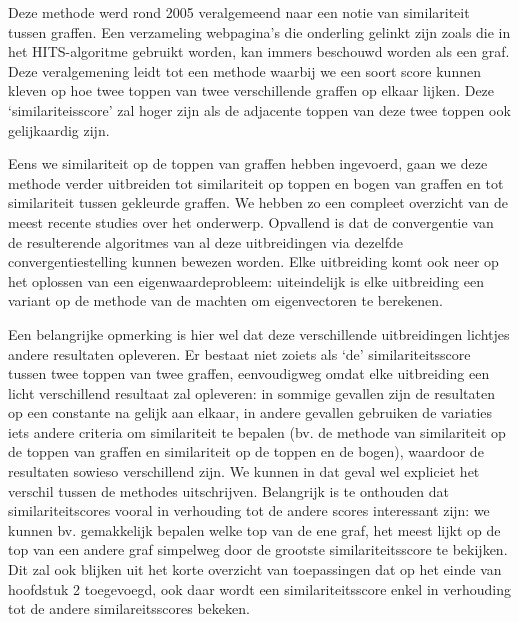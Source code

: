 \documentclass[a4paper,11pt]{report}
\begin{document}
Deze methode werd rond 2005 veralgemeend naar een notie van similariteit tussen 
graffen. Een verzameling webpagina's die onderling gelinkt zijn zoals die in het HITS-algoritme gebruikt worden,
kan immers beschouwd worden als een graf. Deze veralgemening leidt tot een 
methode waarbij we een soort score kunnen kleven op hoe twee toppen van twee verschillende graffen op elkaar lijken. 
Deze `similariteisscore' zal hoger zijn als de adjacente toppen van deze twee toppen 
ook gelijkaardig zijn.

Eens we similariteit op de toppen van graffen hebben ingevoerd, gaan we deze 
methode verder uitbreiden tot similariteit op toppen en bogen van graffen en tot 
similariteit tussen gekleurde graffen. We hebben zo een compleet overzicht van 
de meest recente studies over het onderwerp. Opvallend is dat de convergentie van de resulterende algoritmes van al deze uitbreidingen via 
dezelfde convergentiestelling kunnen bewezen worden. Elke uitbreiding komt ook 
neer op het oplossen van een eigenwaardeprobleem: uiteindelijk is elke 
uitbreiding een variant op de methode van de machten om eigenvectoren te 
berekenen.

Een belangrijke opmerking is hier wel dat deze verschillende uitbreidingen lichtjes 
andere resultaten opleveren. Er bestaat niet zoiets als `de' similariteitsscore tussen twee 
toppen van twee graffen, eenvoudigweg omdat elke uitbreiding een licht verschillend resultaat zal 
opleveren: in sommige gevallen zijn de resultaten op een constante na gelijk aan 
elkaar, in andere gevallen gebruiken de variaties iets andere criteria om 
similariteit te bepalen (bv. de methode van similariteit op de toppen van graffen en similariteit op de toppen en de bogen), waardoor
de resultaten sowieso verschillend zijn. We kunnen in dat geval wel expliciet het verschil tussen de methodes uitschrijven. Belangrijk is te onthouden 
dat similariteitscores vooral in verhouding tot de andere scores interessant zijn: we kunnen 
bv. gemakkelijk bepalen welke top van de ene graf, het meest lijkt op de top van een andere 
graf simpelweg door de grootste similariteitsscore te bekijken.    Dit zal ook blijken uit het korte overzicht van toepassingen dat op 
het einde van hoofdstuk 2 toegevoegd, ook daar wordt een
similariteitsscore enkel in verhouding tot de andere similareitsscores bekeken.
\end{document}
